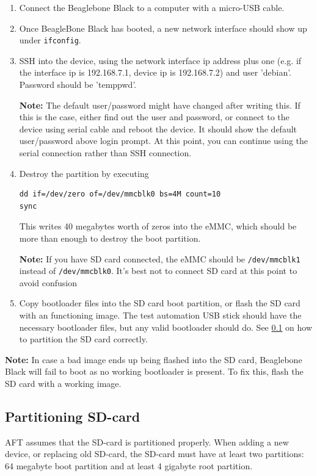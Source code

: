 \documentclass[a4paper,11pt]{article}
\newcommand{\note}{\textbf{Note: }}
\newcommand{\cmd}[1]{\texttt{#1}}
\begin{document}
\begin{enumerate}

\item Connect the Beaglebone Black to a computer with a micro-USB cable. 

\item Once BeagleBone Black has booted, a new network interface should show up under \cmd{ifconfig}.

\item SSH into the device, using the network interface ip address plus one (e.g. if the interface ip is 192.168.7.1, device ip is 192.168.7.2) and user 'debian'. Password should be 'temppwd'.

\note The default user/password might have changed after writing this. If this is the case, either find out the user and password, or connect to the device using serial cable and reboot the device. It should show the default user/password above login prompt. At this point, you can continue using the serial connection rather than SSH connection.

\item Destroy the partition by executing 

\begin{lstlisting}
dd if=/dev/zero of=/dev/mmcblk0 bs=4M count=10
sync
\end{lstlisting}

This writes 40 megabytes worth of zeros into the eMMC, which should be more than enough to destroy the boot partition.

\note If you have SD card connected, the eMMC should be \cmd{/dev/mmcblk1} instead of \cmd{/dev/mmcblk0}. It's best not to connect SD card at this point to avoid confusion

\item Copy bootloader files into the SD card boot partition, or flash the SD card with an functioning image. The test automation USB stick should have the necessary bootloader files, but any valid bootloader should do. See \ref{part_sd} on how to partition the SD card correctly.

\end{enumerate}

\note In case a bad image ends up being flashed into the SD card, Beaglebone Black will fail to boot as no working bootloader is present. To fix this, flash the SD card with a working image.

\subsection{Partitioning SD-card}
\label{part_sd}
AFT assumes that the SD-card is partitioned properly. When adding a new device, or replacing old SD-card, the SD-card must have at least two partitions: 64 megabyte boot partition and at least 4 gigabyte root partition.
\end{document}

